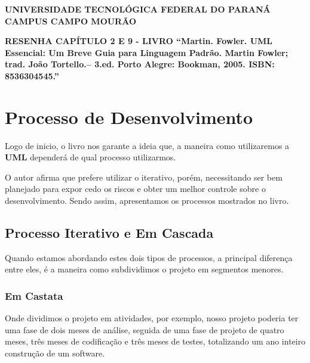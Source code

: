 \documentclass[a4paper, 12pt]{report}
\begin{document}
	\hspace{2cm}

	\begin{large}
		\begin{center}
			\textbf{UNIVERSIDADE TECNOLÓGICA FEDERAL DO PARANÁ}\newline
			\textbf{CAMPUS CAMPO MOURÃO}
		\end{center}
	\end{large}
	
	\vspace{0.5cm}
	
	\begin{center}
		\textbf{RESENHA CAPÍTULO 2 E 9 - LIVRO ``Martin. Fowler. UML Essencial: Um Breve Guia para Linguagem Padrão. Martin Fowler; trad. João Tortello.– 3.ed. Porto Alegre: Bookman, 2005. ISBN: 8536304545.''}
	\end{center}

	\vspace{-1cm}
	{\let\clearpage\relax \chapter{Processo de Desenvolvimento}}
	
	Logo de inicio, o livro nos garante a ideia que, a maneira como utilizaremos a \textbf{UML} dependerá de qual processo utilizarmos. 
	
	O autor afirma que prefere utilizar o iterativo, porém, necessitando ser bem planejado para expor cedo os riscos e obter um melhor controle sobre o desenvolvimento. Sendo assim, apresentamos os processos mostrados no livro.
	
	\section{Processo Iterativo e Em Cascada}
	
	Quando estamos abordando estes dois tipos de processos, a principal diferença entre eles, é a maneira como subdividimos o projeto em segmentos menores.
	
	\subsection{Em Castata}
	Onde dividimos o projeto em atividades, por exemplo, nosso projeto poderia ter uma fase de dois meses de análise, seguida de uma fase de projeto de quatro meses, três meses de codificação e três meses de testes, totalizando um ano inteiro construção de um software.
	
\end{document}
